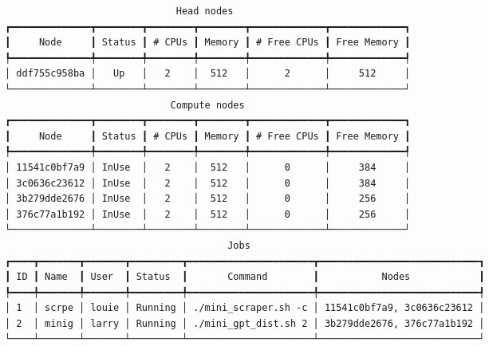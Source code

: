 \begin{adjustbox}{max width=0.475\textwidth}
\begin{BVerbatim}
                              Head nodes                               
┏━━━━━━━━━━━━━━┳━━━━━━━━┳━━━━━━━━┳━━━━━━━━┳━━━━━━━━━━━━━┳━━━━━━━━━━━━━┓
┃     Node     ┃ Status ┃ # CPUs ┃ Memory ┃ # Free CPUs ┃ Free Memory ┃
┡━━━━━━━━━━━━━━╇━━━━━━━━╇━━━━━━━━╇━━━━━━━━╇━━━━━━━━━━━━━╇━━━━━━━━━━━━━┩
│ ddf755c958ba │   Up   │   2    │  512   │      2      │     512     │
└──────────────┴────────┴────────┴────────┴─────────────┴─────────────┘
                             Compute nodes                             
┏━━━━━━━━━━━━━━┳━━━━━━━━┳━━━━━━━━┳━━━━━━━━┳━━━━━━━━━━━━━┳━━━━━━━━━━━━━┓
┃     Node     ┃ Status ┃ # CPUs ┃ Memory ┃ # Free CPUs ┃ Free Memory ┃
┡━━━━━━━━━━━━━━╇━━━━━━━━╇━━━━━━━━╇━━━━━━━━╇━━━━━━━━━━━━━╇━━━━━━━━━━━━━┩
│ 11541c0bf7a9 │ InUse  │   2    │  512   │      0      │     384     │
│ 3c0636c23612 │ InUse  │   2    │  512   │      0      │     384     │
│ 3b279dde2676 │ InUse  │   2    │  512   │      0      │     256     │
│ 376c77a1b192 │ InUse  │   2    │  512   │      0      │     256     │
└──────────────┴────────┴────────┴────────┴─────────────┴─────────────┘
                                       Jobs                                        
┏━━━━┳━━━━━━━┳━━━━━━━┳━━━━━━━━━┳━━━━━━━━━━━━━━━━━━━━━━┳━━━━━━━━━━━━━━━━━━━━━━━━━━━━┓
┃ ID ┃ Name  ┃ User  ┃ Status  ┃       Command        ┃           Nodes            ┃
┡━━━━╇━━━━━━━╇━━━━━━━╇━━━━━━━━━╇━━━━━━━━━━━━━━━━━━━━━━╇━━━━━━━━━━━━━━━━━━━━━━━━━━━━┩
│ 1  │ scrpe │ louie │ Running │ ./mini_scraper.sh -c │ 11541c0bf7a9, 3c0636c23612 │
│ 2  │ minig │ larry │ Running │ ./mini_gpt_dist.sh 2 │ 3b279dde2676, 376c77a1b192 │
└────┴───────┴───────┴─────────┴──────────────────────┴────────────────────────────┘
\end{BVerbatim}
\end{adjustbox}
